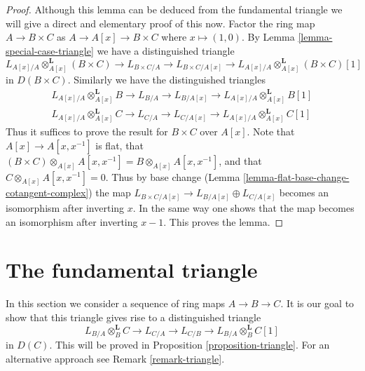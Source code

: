 \documentclass[10pt,a4paper]{article}
\theoremstyle{plain}
\theoremstyle{definition}
\theoremstyle{remark}
\numberwithin{equation}{subsection}
\begin{document}
\begin{proof}
Although this lemma can be deduced from the fundamental triangle
we will give a direct and elementary proof of this now.
Factor the ring map $A \to B \times C$ as $A \to A[x] \to B \times C$
where $x \mapsto (1, 0)$. By Lemma \ref{lemma-special-case-triangle}
we have a distinguished triangle
$$
L_{A[x]/A} \otimes_{A[x]}^\mathbf{L} (B \times C) \to L_{B \times C/A} \to
L_{B \times C/A[x]} \to L_{A[x]/A} \otimes_{A[x]}^\mathbf{L} (B \times C)[1]
$$
in $D(B \times C)$. Similarly we have the distinguished triangles
$$
\begin{matrix}
L_{A[x]/A} \otimes_{A[x]}^\mathbf{L} B \to L_{B/A} \to L_{B/A[x]}
\to L_{A[x]/A} \otimes_{A[x]}^\mathbf{L} B[1] \\
L_{A[x]/A} \otimes_{A[x]}^\mathbf{L} C \to L_{C/A} \to L_{C/A[x]}
\to L_{A[x]/A} \otimes_{A[x]}^\mathbf{L} C[1]
\end{matrix}
$$
Thus it suffices to prove the result for $B \times C$ over $A[x]$.
Note that $A[x] \to A[x, x^{-1}]$ is flat, that
$(B \times C) \otimes_{A[x]} A[x, x^{-1}] = B \otimes_{A[x]} A[x, x^{-1}]$,
and that $C \otimes_{A[x]} A[x, x^{-1}] = 0$.
Thus by base change (Lemma \ref{lemma-flat-base-change-cotangent-complex})
the map $L_{B \times C/A[x]} \to L_{B/A[x]} \oplus L_{C/A[x]}$
becomes an isomorphism after inverting $x$.
In the same way one shows that the map becomes an isomorphism after
inverting $x - 1$. This proves the lemma.
\end{proof}




\section{The fundamental triangle}
\label{section-triangle}

\noindent
In this section we consider a sequence of ring maps $A \to B \to C$.
It is our goal to show that this triangle gives rise to a distinguished
triangle
\begin{equation}
\label{equation-triangle}
L_{B/A} \otimes_B^\mathbf{L} C \to L_{C/A} \to L_{C/B} \to
L_{B/A} \otimes_B^\mathbf{L} C[1]
\end{equation}
in $D(C)$. This will be proved in Proposition \ref{proposition-triangle}.
For an alternative approach see Remark \ref{remark-triangle}.
\end{document}

